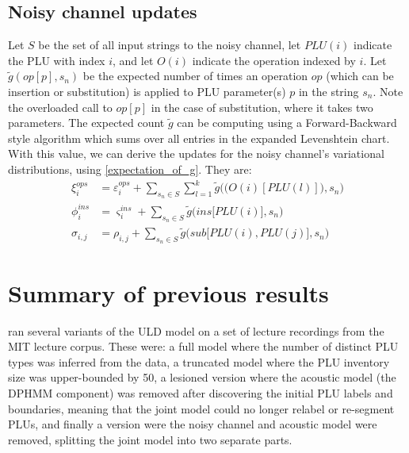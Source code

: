 \documentclass[12pt,letterpaper]{article}
\begin{document}
\subsection{Noisy channel updates}
Let $S$ be the set of all input strings to the noisy channel, let $PLU(i)$ indicate the PLU with index $i$, and let $O(i)$ indicate the operation indexed by $i$. Let $\tilde g(op[p], s_n)$ be the expected number of times an operation $op$ (which can be insertion or substitution) is applied to PLU parameter(s) $p$ in the string $s_n$. Note the overloaded call to $op[p]$ in the case of substitution, where it takes two parameters. The expected count $\tilde g$ can be computing using a Forward-Backward style algorithm which sums over all entries in the expanded Levenshtein chart. With this value, we can derive the updates for the noisy channel's variational distributions, using \eqref{expectation_of_g}. They are:
\begin{align*}
\nonumber \xi^{ops}_i &= \varepsilon^{ops}_i + \sum\limits_{s_n \in S}\sum\limits_{l = 1}^k \tilde g\Big(\big( O(i)[PLU(l)]\big), s_n\Big) \\
\nonumber \phi^{ins}_i &= \varsigma^{ins}_i + \sum\limits_{s_n \in S} \tilde g\Big(ins\big[PLU(i)\big], s_n\Big)\\
\nonumber \sigma_{i,j} &= \rho_{i,j} + \sum\limits_{s_n \in S} \tilde g\Big(sub\big[PLU(i), PLU(j)\big], s_n\Big)
\end{align*}

\section{Summary of previous results}
\citet{lee:2015} ran several variants of the ULD model on a set of lecture recordings from the MIT lecture corpus. These were: a full model where the number of distinct PLU types was inferred from the data, a truncated model where the PLU inventory size was upper-bounded by 50, a lesioned version where the acoustic model (the DPHMM component) was removed after discovering the initial PLU labels and boundaries, meaning that the joint model could no longer relabel or re-segment PLUs, and finally a version were the noisy channel and acoustic model were removed, splitting the joint model into two separate parts. 
\end{document}
